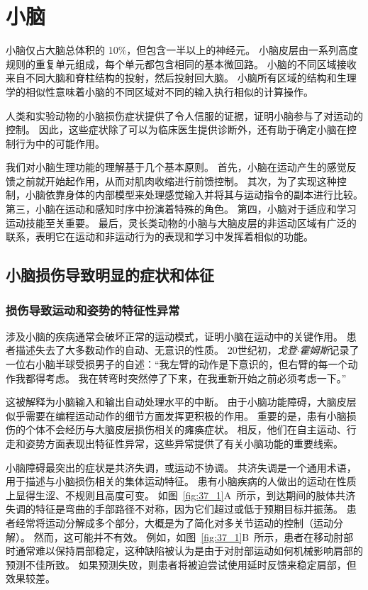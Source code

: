 \chapter{小脑} \label{chap:chap37}

小脑仅占大脑总体积的 10\%，但包含一半以上的神经元。
小脑皮层由一系列高度规则的重复单元组成，每个单元都包含相同的基本微回路。
小脑的不同区域接收来自不同大脑和脊柱结构的投射，然后投射回大脑。
小脑所有区域的结构和生理学的相似性意味着小脑的不同区域对不同的输入执行相似的计算操作。


人类和实验动物的小脑损伤症状提供了令人信服的证据，证明小脑参与了对运动的控制。
因此，这些症状除了可以为临床医生提供诊断外，还有助于确定小脑在控制行为中的可能作用。


我们对小脑生理功能的理解基于几个基本原则。
首先，小脑在运动产生的感觉反馈之前就开始起作用，从而对肌肉收缩进行前馈控制。
其次，为了实现这种控制，小脑依靠身体的内部模型来处理感觉输入并将其与运动指令的副本进行比较。
第三，小脑在运动和感知时序中扮演着特殊的角色。
第四，小脑对于适应和学习运动技能至关重要。
最后，灵长类动物的小脑与大脑皮层的非运动区域有广泛的联系，表明它在运动和非运动行为的表现和学习中发挥着相似的功能。


\section{小脑损伤导致明显的症状和体征}

\subsection{损伤导致运动和姿势的特征性异常}

涉及小脑的疾病通常会破坏正常的运动模式，证明小脑在运动中的关键作用。
患者描述失去了大多数动作的自动、无意识的性质。
20世纪初，\textit{戈登$\cdot$霍姆斯}记录了一位右小脑半球受损男子的自述：“我左臂的动作是下意识的，但右臂的每一个动作我都得考虑。
我在转弯时突然停了下来，在我重新开始之前必须考虑一下。”


这被解释为小脑输入和输出自动处理水平的中断。
由于小脑功能障碍，大脑皮层似乎需要在编程运动动作的细节方面发挥更积极的作用。
重要的是，患有小脑损伤的个体不会经历与大脑皮层损伤相关的瘫痪症状。
相反，他们在自主运动、行走和姿势方面表现出特征性异常，这些异常提供了有关小脑功能的重要线索。


小脑障碍最突出的症状是共济失调，或运动不协调。
共济失调是一个通用术语，用于描述与小脑损伤相关的集体运动特征。
患有小脑疾病的人做出的运动在性质上显得生涩、不规则且高度可变。 
如图~\ref{fig:37_1}A~所示，到达期间的肢体共济失调的特征是弯曲的手部路径不对称，因为它们超过或低于预期目标并振荡。
患者经常将运动分解成多个部分，大概是为了简化对多关节运动的控制（运动分解）。
然而，这可能并不有效。
例如，如图~\ref{fig:37_1}B~所示，患者在移动肘部时通常难以保持肩部稳定，这种缺陷被认为是由于对肘部运动如何机械影响肩部的预测不佳所致。
如果预测失败，则患者将被迫尝试使用延时反馈来稳定肩部，但效果较差。


